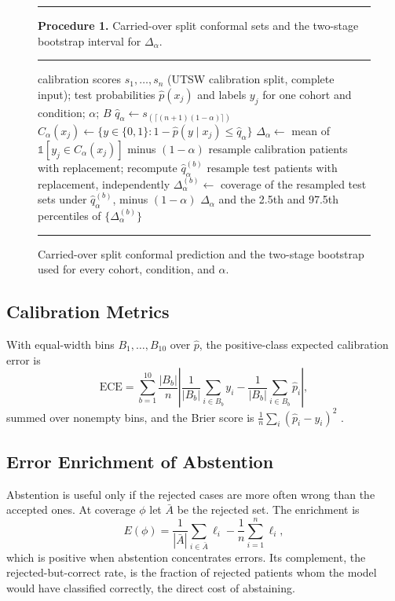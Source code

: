 \documentclass[journal]{IEEEtran}
\begin{document}
\begin{figure}[t]
\footnotesize
\hrule\vspace{3pt}
\textbf{Procedure 1.} Carried-over split conformal sets and the two-stage bootstrap interval for $\Delta_\alpha$.
\vspace{2pt}\hrule\vspace{3pt}
\begin{algorithmic}[1]
\REQUIRE calibration scores $s_1,\dots,s_n$ (UTSW calibration split, complete input); test probabilities $\hat p(x_j)$ and labels $y_j$ for one cohort and condition; $\alpha$; $B$
\STATE $\hat q_\alpha \leftarrow s_{(\lceil (n+1)(1-\alpha)\rceil)}$ 
\STATE $C_\alpha(x_j)\leftarrow\{y\in\{0,1\}: 1-\hat p(y\mid x_j)\le\hat q_\alpha\}$
\ENDFOR
\STATE $\Delta_\alpha \leftarrow$ mean of $\mathbb{1}[y_j\in C_\alpha(x_j)]$ minus $(1-\alpha)$
\STATE resample calibration patients with replacement; recompute $\hat q^{(b)}_\alpha$
\STATE resample test patients with replacement, independently
\STATE $\Delta^{(b)}_\alpha \leftarrow$ coverage of the resampled test sets under $\hat q^{(b)}_\alpha$, minus $(1-\alpha)$
\ENDFOR
\RETURN $\Delta_\alpha$ and the 2.5th and 97.5th percentiles of $\{\Delta^{(b)}_\alpha\}$
\end{algorithmic}
\vspace{2pt}\hrule
\caption{Carried-over split conformal prediction and the two-stage bootstrap used for every cohort, condition, and $\alpha$.}
\label{fig:alg}
\end{figure}

\subsection{Calibration Metrics}
With equal-width bins $B_1,\dots,B_{10}$ over $\hat p$, the positive-class expected calibration error is
\begin{equation}
\mathrm{ECE}=\sum_{b=1}^{10}\frac{|B_b|}{n}\left|\frac{1}{|B_b|}\sum_{i\in B_b}y_i-\frac{1}{|B_b|}\sum_{i\in B_b}\hat p_i\right| ,
\label{eq:ece}
\end{equation}
summed over nonempty bins, and the Brier score is $\frac{1}{n}\sum_i(\hat p_i-y_i)^2$ \cite{brier1950}.

\subsection{Error Enrichment of Abstention}
Abstention is useful only if the rejected cases are more often wrong than the accepted ones. At coverage $\phi$ let $\bar A$ be the rejected set. The enrichment is
\begin{equation}
E(\phi)=\frac{1}{|\bar A|}\sum_{i\in\bar A}\ell_i-\frac{1}{n}\sum_{i=1}^{n}\ell_i ,
\label{eq:enrich}
\end{equation}
which is positive when abstention concentrates errors. Its complement, the rejected-but-correct rate, is the fraction of rejected patients whom the model would have classified correctly, the direct cost of abstaining.
\end{document}

